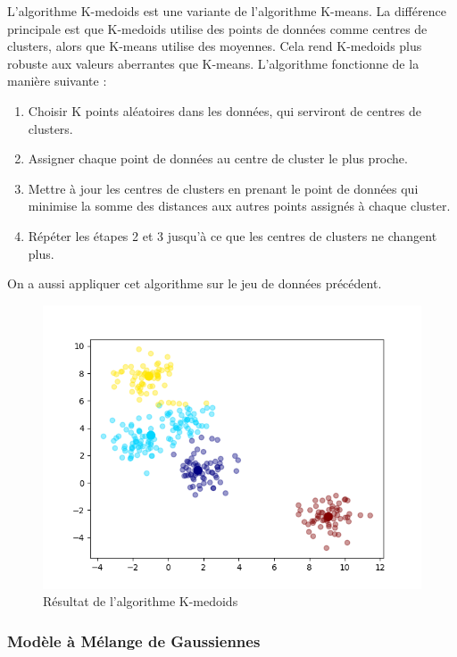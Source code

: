 \documentclass[french,a4paper,18pt]{article}
\begin{document}
L'algorithme K-medoids est une variante de l'algorithme K-means. 
La différence principale est que K-medoids utilise des points de données comme centres de clusters, alors que K-means utilise des moyennes.
Cela rend K-medoids plus robuste aux valeurs aberrantes que K-means.
L'algorithme fonctionne de la manière suivante :
\begin{enumerate}
    \item Choisir K points aléatoires dans les données, qui serviront de centres de clusters.
    \item Assigner chaque point de données au centre de cluster le plus proche.
    \item Mettre à jour les centres de clusters en prenant le point de données qui minimise la somme des distances aux autres points assignés à chaque cluster.
    \item Répéter les étapes 2 et 3 jusqu'à ce que les centres de clusters ne changent plus.
\end{enumerate}

On a aussi appliquer cet algorithme sur le jeu de données précédent.
\begin{figure}[h!]
    \centering
    \includegraphics[scale=0.5]{images/short_simulation_kmedoids.png}
    \caption{Résultat de l'algorithme K-medoids}\label{fig:short_simulation_kmedoids}
\end{figure}

\subsubsection{Modèle à Mélange de Gaussiennes}
\end{document}
